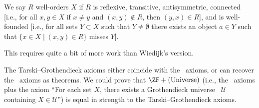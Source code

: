 \begin{node}[Axioms]
\begin{node}[Choice]
\begin{node}
We say $R$ well-orders $X$ if $R$ is reflexive, transitive,
antisymmetric, connected [i.e., for all $x,y\in X$ if $x\neq y$ and
  $(x,y)\notin R$, then $(y,x)\in R$], and is well-founded [i.e., for
  all sets $Y\subset X$ such that $Y\neq\emptyset$ there exists an
  object $a\in Y$ such that $\{x\in X\mid(x,y)\in R\}$ misses $Y$].

This requires quite a bit of more work than Wiedijk's version.
\end{node}
\end{node} %

\begin{node}[Remarks]\label{set:zfc-000D}%
\begin{node}\label{set:zfc-000E}%
The Tarski--Grothendieck axioms 
either coincide with the \ZFC\ axioms, or can recover the \ZFC\ axioms
as theorems. We could prove that $\ZF+(\mbox{Universe})$ (i.e., the
\ZF\ axioms plus the axiom ``For each set $X$, there exists a Grothendieck universe~
$\mathcal{U}$ containing $X\in\mathcal{U}$'') is equal in strength to
the Tarski--Grothendieck axioms.
\end{node} %


\end{node}
\end{node}
